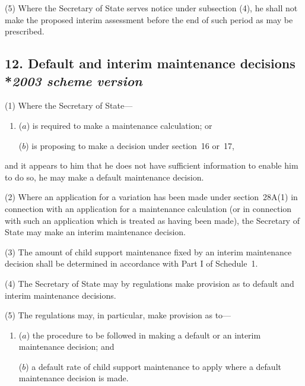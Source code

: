 \documentclass[12pt,a4paper]{article}
\begin{document}
(5) Where 
the Secretary of State  %
serves notice under subsection (4), he shall not make the proposed interim assessment before the end of such period as may be prescribed.


\subsection[12. Default and interim maintenance decisions --- \emph{2003 scheme version}]{12. Default and interim maintenance decisions\\*\emph{2003 scheme version}}

(1) Where the Secretary of State—
\begin{enumerate}\item[]
($a$) is required to make a maintenance calculation; or

($b$) is proposing to make a decision under section~16 or~17,
\end{enumerate}
and it appears to him that he does not have sufficient information to enable him to do so, he may make a default maintenance decision.

(2) Where an application for a variation has been made under section~28A(1)  in connection with an application for a maintenance calculation (or in connection with such an application which is treated as having been made), the Secretary of State may make an interim maintenance decision.

(3) The amount of child support maintenance fixed by an interim maintenance decision shall be determined in accordance with Part I of Schedule~1. 

(4) The Secretary of State may by regulations make provision as to default and interim maintenance decisions.

(5) The regulations may, in particular, make provision as to—
\begin{enumerate}\item[]
($a$) the procedure to be followed in making a default or an interim maintenance decision; and

($b$) a default rate of child support maintenance to apply where a default maintenance decision is made.
\end{enumerate}
\end{document}
